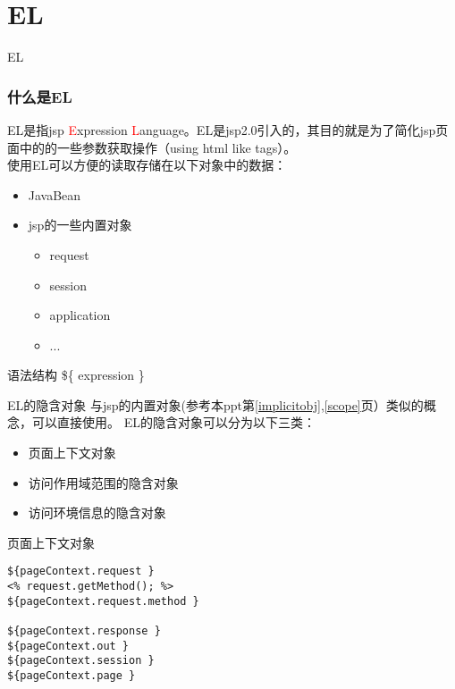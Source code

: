 \documentclass{beamer}
\begin{document}
\section{EL} %
\begin{frame}
\Huge{\centerline{EL}}
\end{frame}
\begin{frame}
\frametitle{什么是EL}
EL是指jsp \textcolor{red}{E}xpression \textcolor{red}{L}anguage。EL是jsp2.0引入的，其目的就是为了简化jsp页面中的的一些参数获取操作（using html like tags）。\\

使用EL可以方便的读取存储在以下对象中的数据：
\begin{itemize}
\item
JavaBean
\item
jsp的一些内置对象
\begin{itemize}
\item
request
\item
session
\item
application
\item
...
\end{itemize}
\end{itemize}
\begin{block}{语法结构}
\$\{ expression \}
\end{block}
\end{frame}
\begin{frame}{EL的隐含对象}
\label{elimplicit}
与jsp的内置对象(参考本ppt第\ref{implicitobj},\ref{scope}页）类似的概念，可以直接使用。
EL的隐含对象可以分为以下三类：
\begin{itemize}
\item
页面上下文对象
\item
访问作用域范围的隐含对象
\item
访问环境信息的隐含对象
\end{itemize}
\end{frame}
\begin{frame}[fragile]{页面上下文对象}
\begin{block}{}
\begin{lstlisting}
${pageContext.request }
<% request.getMethod(); %>
${pageContext.request.method }

${pageContext.response }
${pageContext.out }
${pageContext.session }
${pageContext.page }

\end{lstlisting}
\end{block}
\end{frame}
\end{document}
